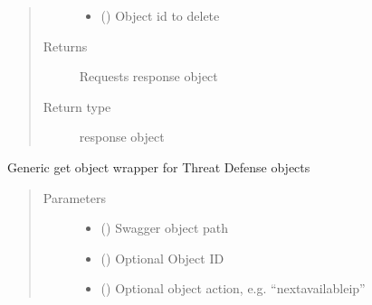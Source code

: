 \documentclass[letterpaper,10pt,english]{sphinxmanual}
\begin{document}
\begin{fulllineitems}
\begin{fulllineitems}
\begin{quote}
\begin{description}
\begin{itemize}
\item {} 
\sphinxAtStartPar
{} () \textendash{} Object id to delete

\end{itemize}

\item[{Returns}] \leavevmode
\sphinxAtStartPar
Requests response object

\item[{Return type}] \leavevmode
\sphinxAtStartPar
response object

\end{description}\end{quote}

\end{fulllineitems}


\begin{fulllineitems}
\label{\detokenize{b1tdep-class:bloxone.b1tdep.get}}
\sphinxAtStartPar
Generic get object wrapper for Threat Defense objects
\begin{quote}\begin{description}
\item[{Parameters}] \leavevmode\begin{itemize}
\item {} 
\sphinxAtStartPar
{} () \textendash{} Swagger object path

\item {} 
\sphinxAtStartPar
{} () \textendash{} Optional Object ID

\item {} 
\sphinxAtStartPar
{} () \textendash{} Optional object action, e.g. “nextavailableip”

\end{itemize}


\end{description}
\end{quote}
\end{fulllineitems}
\end{fulllineitems}
\end{document}
